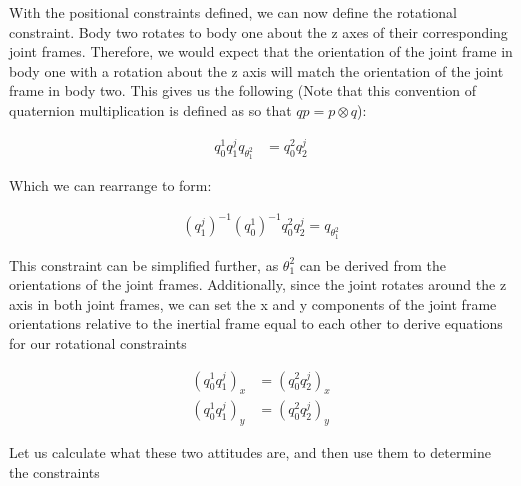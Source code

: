 \documentclass{article}
\begin{document}
With the positional constraints defined, we can now define the rotational constraint.  Body two rotates to body one about the z axes of their corresponding joint frames.  Therefore, we would expect that the orientation of the joint frame in body one with a rotation about the z axis will match the orientation of the joint frame in body two.  This gives us the following (Note that this convention of quaternion multiplication is defined as so that $qp = p\otimes q$):

\begin{align}
    q_0^1q_1^jq_{\theta_1^2} &= q_0^2q_2^j
\end{align}

Which we can rearrange to form:

\begin{align}
    (q_1^j)^{-1}(q_0^1)^{-1}q_0^2q_2^j = q_{\theta_1^2}
\end{align}

This constraint can be simplified further, as $\theta_1^2$ can be derived from the orientations of the joint frames.  Additionally, since the joint rotates around the z axis in both joint frames, we can set the x and y components of the joint frame orientations relative to the inertial frame equal to each other to derive equations for our rotational constraints

\begin{align}
    (q_0^1q_1^j)_x &= (q_0^2q_2^j)_x \\
    (q_0^1q_1^j)_y &= (q_0^2q_2^j)_y
\end{align}

Let us calculate what these two attitudes are, and then use them to determine the constraints
\end{document}
